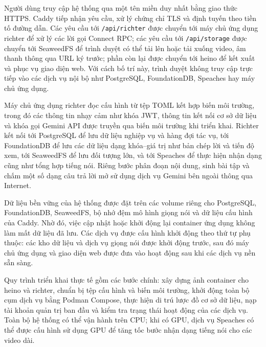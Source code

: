 \documentclass[../DoAn.tex]{subfiles}
\begin{document}
Người dùng truy cập hệ thống qua một tên miền duy nhất bằng giao thức HTTPS. Caddy tiếp nhận yêu cầu, xử lý chứng chỉ TLS và định tuyến theo tiền tố đường dẫn. Các yêu cầu tới \texttt{/api/richter} được chuyển tới máy chủ ứng dụng richter để xử lý các lời gọi Connect RPC; các yêu cầu tới \texttt{/api/storage} được chuyển tới SeaweedFS để trình duyệt có thể tải lên hoặc tải xuống video, âm thanh thông qua URL ký trước; phần còn lại được chuyển tới heino để kết xuất và phục vụ giao diện web. Với cách bố trí này, trình duyệt không truy cập trực tiếp vào các dịch vụ nội bộ như PostgreSQL, FoundationDB, Speaches hay máy chủ ứng dụng.

Máy chủ ứng dụng richter đọc cấu hình từ tệp TOML kết hợp biến môi trường, trong đó các thông tin nhạy cảm như khóa JWT, thông tin kết nối cơ sở dữ liệu và khóa gọi Gemini API được truyền qua biến môi trường khi triển khai. Richter kết nối tới PostgreSQL để lưu dữ liệu nghiệp vụ và hàng đợi tác vụ, tới FoundationDB để lưu các dữ liệu dạng khóa--giá trị như bản chép lời và tiến độ xem, tới SeaweedFS để lưu đối tượng lớn, và tới Speaches để thực hiện nhận dạng cũng như tổng hợp tiếng nói. Riêng bước phân đoạn nội dung, sinh bài tập và chấm một số dạng câu trả lời mở sử dụng dịch vụ Gemini bên ngoài thông qua Internet.

Dữ liệu bền vững của hệ thống được đặt trên các volume riêng cho PostgreSQL, FoundationDB, SeaweedFS, bộ nhớ đệm mô hình giọng nói và dữ liệu cấu hình của Caddy. Nhờ đó, việc cập nhật hoặc khởi động lại container ứng dụng không làm mất dữ liệu đã lưu. Các dịch vụ được cấu hình khởi động theo thứ tự phụ thuộc: các kho dữ liệu và dịch vụ giọng nói được khởi động trước, sau đó máy chủ ứng dụng và giao diện web được đưa vào hoạt động sau khi các dịch vụ nền sẵn sàng.

Quy trình triển khai thực tế gồm các bước chính: xây dựng ảnh container cho heino và richter, chuẩn bị tệp cấu hình và biến môi trường, khởi động toàn bộ cụm dịch vụ bằng Podman Compose, thực hiện di trú lược đồ cơ sở dữ liệu, nạp tài khoản quản trị ban đầu và kiểm tra trạng thái hoạt động của các dịch vụ. Toàn bộ hệ thống có thể vận hành trên CPU; khi có GPU, dịch vụ Speaches có thể được cấu hình sử dụng GPU để tăng tốc bước nhận dạng tiếng nói cho các video dài.
\end{document}
